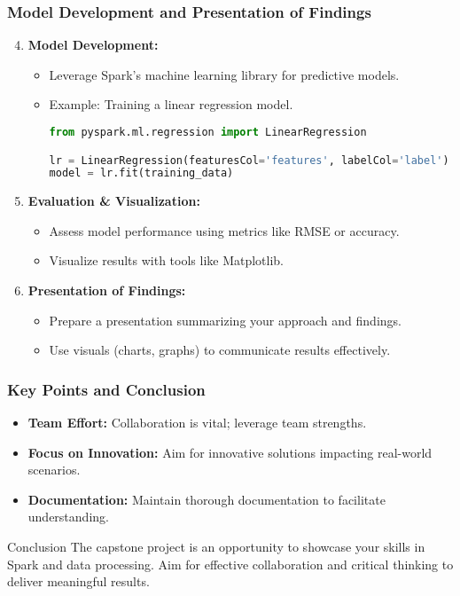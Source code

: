 \documentclass[aspectratio=169]{beamer}
\begin{document}
\begin{frame}[fragile]
    \frametitle{Model Development and Presentation of Findings}
    \begin{enumerate}
        \setcounter{enumi}{3}
        \item \textbf{Model Development:}
            \begin{itemize}
                \item Leverage Spark’s machine learning library for predictive models.
                \item Example: Training a linear regression model.
                \begin{lstlisting}[language=python]
from pyspark.ml.regression import LinearRegression

lr = LinearRegression(featuresCol='features', labelCol='label')
model = lr.fit(training_data)
                \end{lstlisting}
            \end{itemize}
        \item \textbf{Evaluation \& Visualization:}
            \begin{itemize}
                \item Assess model performance using metrics like RMSE or accuracy.
                \item Visualize results with tools like Matplotlib.
            \end{itemize}
        \item \textbf{Presentation of Findings:}
            \begin{itemize}
                \item Prepare a presentation summarizing your approach and findings.
                \item Use visuals (charts, graphs) to communicate results effectively.
            \end{itemize}
    \end{enumerate}
\end{frame}

\begin{frame}[fragile]
    \frametitle{Key Points and Conclusion}
    \begin{itemize}
        \item \textbf{Team Effort:} Collaboration is vital; leverage team strengths.
        \item \textbf{Focus on Innovation:} Aim for innovative solutions impacting real-world scenarios.
        \item \textbf{Documentation:} Maintain thorough documentation to facilitate understanding.
    \end{itemize}
    \begin{block}{Conclusion}
        The capstone project is an opportunity to showcase your skills in Spark and data processing. Aim for effective collaboration and critical thinking to deliver meaningful results.
    \end{block}
\end{frame}
\end{document}
